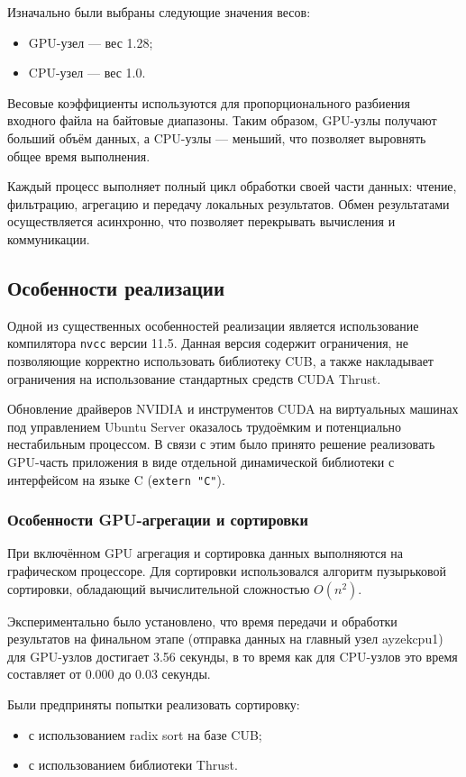 \documentclass[areaset=advanced]{scrartcl}
\begin{document}
Изначально были выбраны следующие значения весов:
\begin{itemize}
    \item GPU-узел — вес 1.28;
    \item CPU-узел — вес 1.0.
\end{itemize}

Весовые коэффициенты используются для пропорционального разбиения входного файла
на байтовые диапазоны. Таким образом, GPU-узлы получают больший объём данных,
а CPU-узлы — меньший, что позволяет выровнять общее время выполнения.

Каждый процесс выполняет полный цикл обработки своей части данных:
чтение, фильтрацию, агрегацию и передачу локальных результатов. Обмен результатами
осуществляется асинхронно, что позволяет перекрывать вычисления и коммуникации.

\subsection{Особенности реализации}

Одной из существенных особенностей реализации является использование компилятора
\texttt{nvcc} версии 11.5. Данная версия содержит ограничения, не позволяющие
корректно использовать библиотеку CUB, а также накладывает ограничения на
использование стандартных средств CUDA Thrust.

Обновление драйверов NVIDIA и инструментов CUDA на виртуальных машинах под
управлением Ubuntu Server оказалось трудоёмким и потенциально нестабильным
процессом. В связи с этим было принято решение реализовать GPU-часть приложения
в виде отдельной динамической библиотеки с интерфейсом на языке C
(\texttt{extern "C"}).

\subsubsection{Особенности GPU-агрегации и сортировки}
При включённом GPU агрегация и сортировка данных выполняются на графическом
процессоре. Для сортировки использовался алгоритм пузырьковой сортировки,
обладающий вычислительной сложностью $O(n^2)$.

Экспериментально было установлено, что время передачи и обработки результатов
на финальном этапе (отправка данных на главный узел ayzekcpu1) для GPU-узлов
достигает 3.56 секунды, в то время как для CPU-узлов это время составляет
от 0.000 до 0.03 секунды.

Были предприняты попытки реализовать сортировку:
\begin{itemize}
    \item с использованием radix sort на базе CUB;
    \item с использованием библиотеки Thrust.
\end{itemize}
\end{document}
